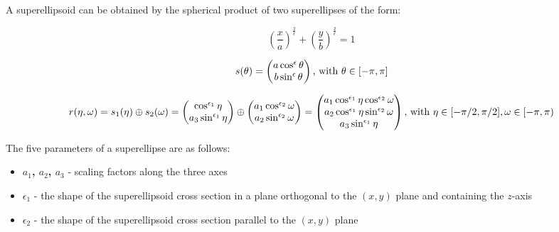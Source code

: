 \documentclass{article}
\begin{document}
A superellipsoid can be obtained by the spherical product of two superellipses of the form:

\begin{equation}
\left(\frac{x}{a}\right)^{\frac{2}{\epsilon}} + \left(\frac{y}{b}\right)^{\frac{2}{\epsilon}} = 1
\end{equation}

\begin{equation}
s(\theta) = \begin{pmatrix} a \cos^\epsilon{\theta} \\ b \sin^\epsilon {\theta} \end{pmatrix} \textnormal{, with } \theta \in [-\pi, \pi]
\end{equation}

\begin{equation}
r (\eta, \omega) = s_1 (\eta) \oplus s_2 (\omega) = \begin{pmatrix} \cos^{\epsilon_1} {\eta} \\ a_3 \sin^{\epsilon_1} {\eta} \end{pmatrix} \oplus \begin{pmatrix} a_1 \cos^{\epsilon_2} {\omega} \\ a_2 \sin^{\epsilon_2} {\omega} \end{pmatrix} = \begin{pmatrix} a_1 \cos^{\epsilon_1} {\eta} \cos^{\epsilon_2} {\omega} \\ a_2 \cos^{\epsilon_1} {\eta} \sin^{\epsilon_2} {\omega} \\ a_3 \sin^{\epsilon_1}{\eta}\end{pmatrix} \textnormal{, with } \eta \in [-\pi/2, \pi/2], \omega \in [-\pi, \pi)
\end{equation}

The five parameters of a superellipse are as follows:

\begin{itemize}
	\item {\textbf{$a_1$, $a_2$, $a_3$} - scaling factors along the three axes}
	\item {\textbf{$\epsilon_1$} - the shape of the superellipsoid cross section in a plane orthogonal to the $(x, y)$ plane and containing the $z$-axis}
	\item {\textbf{$\epsilon_2$} - the shape of the superellipsoid cross section parallel to the $(x, y)$ plane}	
\end{itemize}

\end{document}
